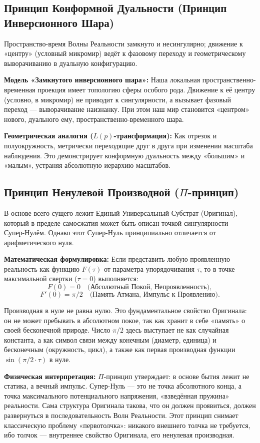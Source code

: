 \documentclass[a4paper,12pt]{article}
\begin{document}
\subsection{Принцип Конформной Дуальности (Принцип Инверсионного Шара)}

Пространство-время Волны Реальности замкнуто и несингулярно; движение к «центру» (условный микромир) ведёт к фазовому переходу и геометрическому выворачиванию в дуальную конфигурацию.

\textbf{Модель «Замкнутого инверсионного шара»:} Наша локальная пространственно-временная проекция имеет топологию сферы особого рода. Движение к её центру (условно, в микромир) не приводит к сингулярности, а вызывает фазовый переход — выворачивание наизнанку. При этом наш мир становится «центром» нового, дуального ему, пространственно-временного шара.

\textbf{Геометрическая аналогия ($L(p)$-трансформация):} Как отрезок и полуокружность, метрически переходящие друг в друга при изменении масштаба наблюдения. Это демонстрирует конформную дуальность между «большим» и «малым», устраняя абсолютную иерархию масштабов.

\subsection{Принцип Ненулевой Производной ($\Pi$-принцип)}

В основе всего сущего лежит Единый Универсальный Субстрат (Оригинал), который в пределе самосжатия может быть описан точкой сингулярности — Супер-Нулём. Однако этот Супер-Нуль принципиально отличается от арифметического нуля.

\textbf{Математическая формулировка:} Если представить любую проявленную реальность как функцию $F(\tau)$ от параметра упорядочивания $\tau$, то в точке максимальной свертки ($\tau = 0$) выполняется:
\[
F(0) = 0 \quad \text{(Абсолютный Покой, Непроявленность)},
\]
\[
F'(0) = \pi/2 \quad \text{(Память Атмана, Импульс к Проявлению)}.
\]

Производная в нуле не равна нулю. Это фундаментальное свойство Оригинала: он не может пребывать в абсолютном покое, так как хранит в себе «память» о своей бесконечной природе. Число $\pi/2$ здесь выступает не как случайная константа, а как символ связи между конечным (диаметр, единица) и бесконечным (окружность, цикл), а также как первая производная функции $\sin(\pi/2 \cdot \tau)$ в нуле.

\textbf{Физическая интерпретация:} $\Pi$-принцип утверждает: в основе бытия лежит не статика, а вечный импульс. Супер-Нуль — это не точка абсолютного конца, а точка максимального потенциального напряжения, «взведённая пружина» реальности. Сама структура Оригинала такова, что он должен проявиться, должен развернуться в последовательность Волн Реальности. Этот принцип снимает классическую проблему «первотолчка»: никакого внешнего толчка не требуется, ибо толчок — внутреннее свойство Оригинала, его ненулевая производная.
\end{document}
